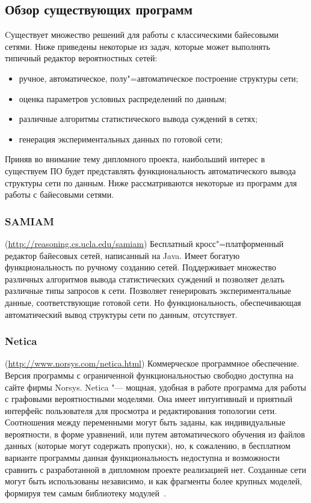 \subsection{Обзор существующих программ} %
\label{sub:domain:existing_programs}
Cуществует множество решений для работы с классическими байесовыми сетями.
Ниже приведены некоторые из задач, которые может выполнять типичный редактор вероятностных сетей:
\begin{itemize}
  \item ручное, автоматическое, полу"=автоматическое построение структуры сети;
  \item оценка параметров условных распределений по данным;
  \item различные алгоритмы статистического вывода суждений в сетях;
  \item генерация экспериментальных данных по готовой сети;
\end{itemize}

Приняв во внимание тему дипломного проекта, наибольший интерес в существуем ПО будет представлять функциональность автоматического вывода структуры сети по данным.
Ниже рассматриваются некоторые из программ для работы с байесовыми сетями.

\subsubsection{SAMIAM }(\url{http://reasoning.cs.ucla.edu/samiam}) 
Бесплатный кросс"=платформенный редактор байесовых сетей, написанный на Java.
Имеет богатую функциональность по ручному созданию сетей.
Поддерживает множество различных алгоритмов вывода статистических суждений и позволяет делать различные типы запросов к сети.
Позволяет генерировать экспериментальные данные, соответствующие готовой сети.
Но функциональность, обеспечивающая автоматический вывод структуры сети по данным, отсутствует.

\subsubsection{Netica }(\url{http://www.norsys.com/netica.html}) 
Коммерческое программное обеспечение.
Версия программы с ограниченной функциональностью свободно доступна на сайте фирмы Norsys.
Netica "--- мощная, удобная в работе программа для работы с графовыми вероятностными моделями. 
Она имеет интуитивный и приятный интерфейс пользователя для просмотра и редактирования топологии сети. 
Соотношения между переменными могут быть заданы, как индивидуальные вероятности, в форме уравнений, или путем автоматического обучения из файлов данных (которые могут содержать пропуски), но, к сожалению, в бесплатном варианте программы данная функциональность недоступна и возможности сравнить с разработанной в дипломном проекте реализацией нет.
Созданные сети могут быть использованы независимо, и как фрагменты более крупных моделей, формируя тем самым библиотеку модулей~\cite{terehov_2003}.

